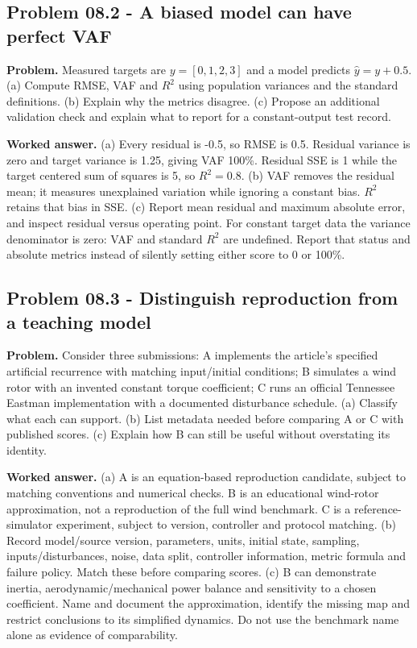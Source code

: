\documentclass[11pt,a4paper]{article}
\begin{document}
\subsection{Problem 08.2 - A biased model can have perfect VAF}
\textbf{Problem.} Measured targets are $y=[0,1,2,3]$ and a model predicts $\hat y=y+0.5$. (a) Compute RMSE, VAF and $R^2$ using population variances and the standard definitions. (b) Explain why the metrics disagree. (c) Propose an additional validation check and explain what to report for a constant-output test record.


\textbf{Worked answer.} (a) Every residual is -0.5, so RMSE is 0.5. Residual variance is zero and target variance is 1.25, giving VAF 100\%. Residual SSE is 1 while the target centered sum of squares is 5, so $R^2=0.8$. (b) VAF removes the residual mean; it measures unexplained variation while ignoring a constant bias. $R^2$ retains that bias in SSE. (c) Report mean residual and maximum absolute error, and inspect residual versus operating point. For constant target data the variance denominator is zero: VAF and standard $R^2$ are undefined. Report that status and absolute metrics instead of silently setting either score to 0 or 100\%.

\subsection{Problem 08.3 - Distinguish reproduction from a teaching model}
\textbf{Problem.} Consider three submissions: A implements the article's specified artificial recurrence with matching input/initial conditions; B simulates a wind rotor with an invented constant torque coefficient; C runs an official Tennessee Eastman implementation with a documented disturbance schedule. (a) Classify what each can support. (b) List metadata needed before comparing A or C with published scores. (c) Explain how B can still be useful without overstating its identity.


\textbf{Worked answer.} (a) A is an equation-based reproduction candidate, subject to matching conventions and numerical checks. B is an educational wind-rotor approximation, not a reproduction of the full wind benchmark. C is a reference-simulator experiment, subject to version, controller and protocol matching. (b) Record model/source version, parameters, units, initial state, sampling, inputs/disturbances, noise, data split, controller information, metric formula and failure policy. Match these before comparing scores. (c) B can demonstrate inertia, aerodynamic/mechanical power balance and sensitivity to a chosen coefficient. Name and document the approximation, identify the missing map and restrict conclusions to its simplified dynamics. Do not use the benchmark name alone as evidence of comparability.
\end{document}
